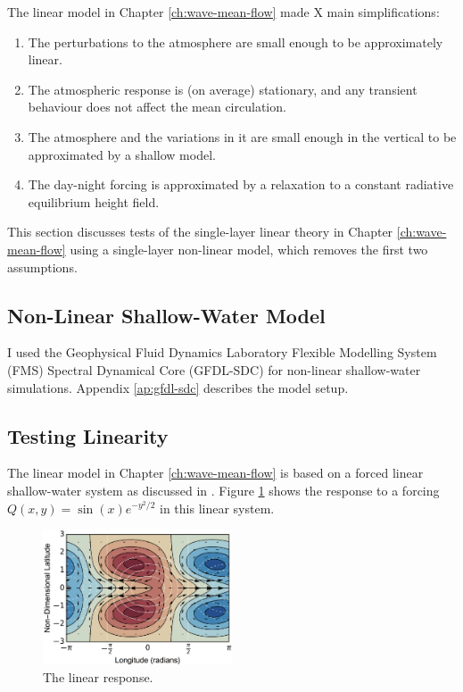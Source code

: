 
The linear model in Chapter \ref{ch:wave-mean-flow} made X main simplifications:

\begin{enumerate}
  \item The perturbations to the atmosphere are small enough to be approximately linear.
  \item The atmospheric response is (on average) stationary, and any transient behaviour does not affect the mean circulation.
  \item The atmosphere and the variations in it are small enough in the vertical to be approximated by a shallow model.
  \item The day-night forcing is approximated by a relaxation to a constant radiative equilibrium height field.
\end{enumerate}

This section discusses tests of the single-layer linear theory in Chapter \ref{ch:wave-mean-flow} using a single-layer non-linear model, which removes the first two assumptions.


\subsection*{Non-Linear Shallow-Water Model}

I used the Geophysical Fluid Dynamics Laboratory Flexible Modelling System (FMS) Spectral Dynamical Core (GFDL-SDC) for non-linear shallow-water simulations. Appendix \ref{ap:gfdl-sdc} describes the model setup.

\subsection*{Testing Linearity}

The linear model in Chapter \ref{ch:wave-mean-flow} is based on a forced linear shallow-water system as discussed in \citet{matsuno1966quasi}. Figure \ref{fig:linear-matsuno-response} shows the response to a forcing $Q(x,y) = \sin(x) e^{-y^{2}/2}$ in this linear system.

\begin{figure}
  \centering
    \includegraphics[width=0.5\textwidth]{figures/nonlinear-circulation/motivate-showman.png}
    \caption{The linear response.}
    \label{fig:linear-matsuno-response}
\end{figure}

